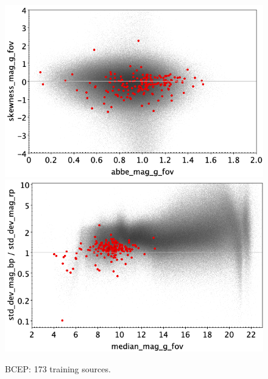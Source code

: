 \documentclass[longauth]{aa}
\begin{document}
\begin{appendix}
\begin{figure}
\vspace{4mm}
 \includegraphics[width=0.45\hsize]{figures/appendix/BCEP_trn_ask.png}  %
\hspace{2mm}
 \includegraphics[width=0.45\hsize]{figures/appendix/BCEP_trn_msdr.png}  \\ %
\vspace{4mm}
 \caption{BCEP: 173 training sources.}  
 \label{fig:app:BCEP_trn}
\end{figure}


\end{appendix}
\end{document}
